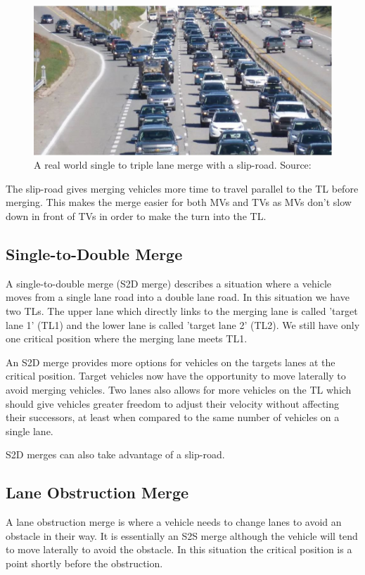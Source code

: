 \begin{figure}[htb]
\includegraphics[width=\textwidth]{images/laneDiagrams/realLaneMerge.jpg}
\caption{A real world single to triple lane merge with a slip-road. Source: \citep{realLaneMerge}}
\label{fig:realLaneMerge}
\end{figure}

The slip-road gives merging vehicles more time to travel parallel to the TL before merging. This makes the merge easier for both MVs and TVs as MVs don't slow down in front of TVs in order to make the turn into the TL.

\subsection{Single-to-Double Merge}
\label{subsec:Single-to-Double Merge}
A single-to-double merge (S2D merge) describes a situation where a vehicle moves from a single lane road into a double lane road. In this situation we have two TLs. The upper lane which directly links to the merging lane is called 'target lane 1' (TL1) and the lower lane is called 'target lane 2' (TL2). We still have only one critical position where the merging lane meets TL1.

An S2D merge provides more options for vehicles on the targets lanes at the critical position. Target vehicles now have the opportunity to move laterally to avoid merging vehicles. Two lanes also allows for more vehicles on the TL which should give vehicles greater freedom to adjust their velocity without affecting their successors, at least when compared to the same number of vehicles on a single lane.

S2D merges can also take advantage of a slip-road.

\subsection{Lane Obstruction Merge}
\label{subsec:Lane Obstruction Merge}
A lane obstruction merge is where a vehicle needs to change lanes to avoid an obstacle in their way. It is essentially an S2S merge although the vehicle will tend to move laterally to avoid the obstacle. In this situation the critical position is a point shortly before the obstruction. 

